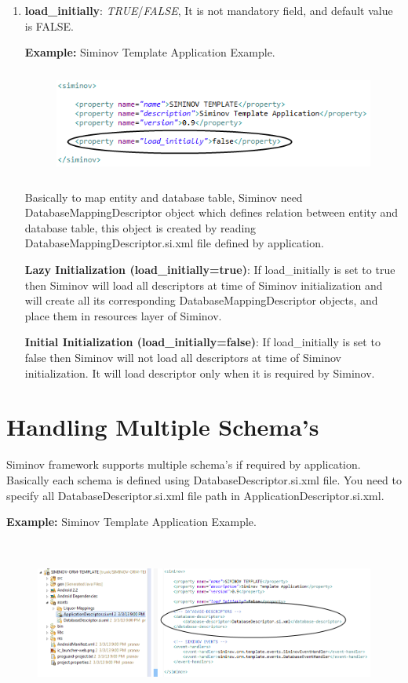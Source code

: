 \begin{enumerate}

	\item \small \textbf{load\_initially}: \textit{TRUE}/\textit{FALSE}, It is not mandatory field, and default value is FALSE.

		\par
		\textbf{Example:} Siminov Template Application Example.
		\begin{figure}[htbp]
			\centering
				\includegraphics[height=3.5cm]{Resources/siminov_application_template_application_descriptor_load_example.png}
		\end{figure}

		\par
			Basically to map entity and database table, Siminov need DatabaseMappingDescriptor object which defines relation between entity and database table, this object is created by reading DatabaseMappingDescriptor.si.xml file defined by application.

		\par
			\textbf{Lazy Initialization (load\_initially=true)}: If load\_initially is set to true then Siminov will load all descriptors at time of Siminov initialization and will create all its corresponding DatabaseMappingDescriptor objects, and place them in resources layer of Siminov.

		\par
			\textbf{Initial Initialization (load\_initially=false)}: If load\_initially is set to false then Siminov will not load all descriptors at time of Siminov initialization. It will load descriptor only when it is required by Siminov.

\end{enumerate}


\newpage
\section{Handling Multiple Schema's}
Siminov framework supports multiple schema's if required by application. Basically each schema is defined using DatabaseDescriptor.si.xml file. You need to specify all DatabaseDescriptor.si.xml file path in ApplicationDescriptor.si.xml.

		\par
		\textbf{Example:} Siminov Template Application Example.
		\begin{figure}[htbp]
			\centering
				\includegraphics[height=5.5cm]{Resources/siminov_application_multiple_schemas_example.png}
		\end{figure}



